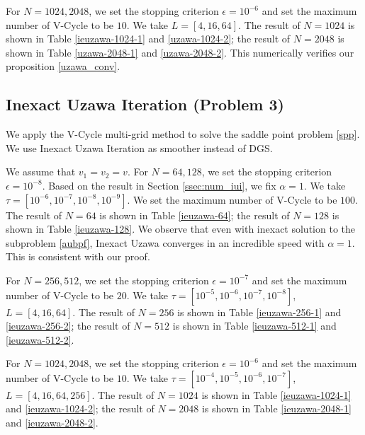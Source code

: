 \documentclass[english]{pkupaper}
\begin{document}
For $N=1024, 2048$, we set the stopping criterion $\epsilon = 10^{-6}$ and set the maximum number of V-Cycle to be $10$. We take $L=[4, 16, 64]$. The result of $N=1024$ is shown in Table \ref{ieuzawa-1024-1} and \ref{uzawa-1024-2}; the result of $N=2048$ is shown in Table \ref{uzawa-2048-1} and \ref{uzawa-2048-2}. This numerically verifies our proposition \ref{uzawa_conv}.





\subsection{Inexact Uzawa Iteration (Problem 3)}
We apply the V-Cycle multi-grid method to solve the saddle point problem \ref{spp}. We use Inexact Uzawa Iteration as smoother instead of DGS. 

We assume that $v_1=v_2=v$. For $N=64, 128$, we set the stopping criterion $\epsilon = 10^{-8}$. Based on the result in Section \ref{ssec:num_iui}, we fix $\alpha = 1$. We take $\tau=[10^{-6}, 10^{-7}, 10^{-8}, 10^{-9}]$. We set the maximum number of V-Cycle to be $100$. The result of $N=64$ is shown in Table \ref{ieuzawa-64}; the result of $N=128$ is shown in Table \ref{ieuzawa-128}. We observe that even with inexact solution to the subproblem \ref{aubpf}, Inexact Uzawa converges in an incredible speed with $\alpha = 1$. This is consistent with our proof.




For $N=256, 512$, we set the stopping criterion $\epsilon = 10^{-7}$ and set the maximum number of V-Cycle to be $20$. We take $\tau=[10^{-5}, 10^{-6}, 10^{-7}, 10^{-8}]$, $L=[4,16,64]$. The result of $N=256$ is shown in Table \ref{ieuzawa-256-1} and \ref{ieuzawa-256-2}; the result of $N=512$ is shown in Table \ref{ieuzawa-512-1} and \ref{ieuzawa-512-2}.





For $N=1024, 2048$, we set the stopping criterion $\epsilon = 10^{-6}$ and set the maximum number of V-Cycle to be $10$. We take $\tau=[10^{-4}, 10^{-5}, 10^{-6}, 10^{-7}]$, $L=[4, 16 ,64, 256]$. The result of $N=1024$ is shown in Table \ref{ieuzawa-1024-1} and \ref{ieuzawa-1024-2}; the result of $N=2048$ is shown in Table \ref{ieuzawa-2048-1} and \ref{ieuzawa-2048-2}.





\end{document}
